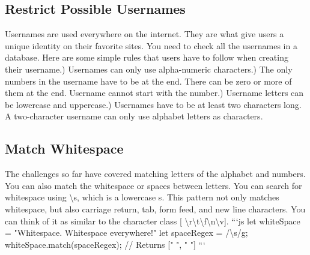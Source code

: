\documentclass{article}%
\begin{document}
%
\subsection{Restrict Possible Usernames}%
\label{subsec:RestrictPossibleUsernames}%
Usernames are used everywhere on the internet. They are what give users a unique identity on their favorite sites.\newline%
You need to check all the usernames in a database. Here are some simple rules that users have to follow when creating their username.) Usernames can only use alpha{-}numeric characters.) The only numbers in the username have to be at the end. There can be zero or more of them at the end. Username cannot start with the number.) Username letters can be lowercase and uppercase.) Usernames have to be at least two characters long. A two{-}character username can only use alphabet letters as characters.\newline%

%
\subsection{Match Whitespace}%
\label{subsec:MatchWhitespace}%
The challenges so far have covered matching letters of the alphabet and numbers. You can also match the whitespace or spaces between letters.\newline%
You can search for whitespace using \textbackslash{}s, which is a lowercase s. This pattern not only matches whitespace, but also carriage return, tab, form feed, and new line characters. You can think of it as similar to the character class {[} \textbackslash{}r\textbackslash{}t\textbackslash{}f\textbackslash{}n\textbackslash{}v{]}.\newline%
```js\newline%
let whiteSpace = "Whitespace. Whitespace everywhere!"\newline%
let spaceRegex = /\textbackslash{}s/g;\newline%
whiteSpace.match(spaceRegex);\newline%
// Returns {[}" ", " "{]}\newline%
```\newline%

%
\end{document}
